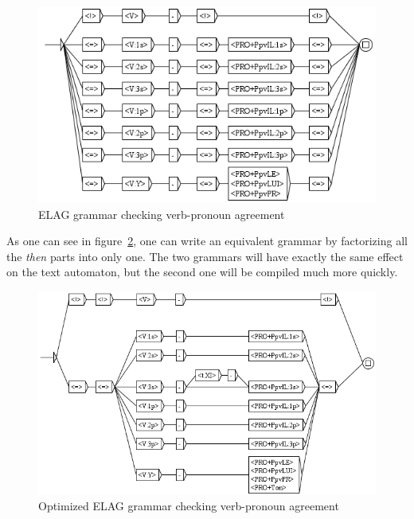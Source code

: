 \begin{figure}[!h]
\begin{center}
\includegraphics[width=15cm]{resources/img/fig7-21.png}
\caption{ELAG grammar checking verb-pronoun agreement\label{fig-NA-bad}}
\end{center}
\end{figure}

\bigskip
\noindent As one can see in figure~\ref{fig-NA-good}, one can write an
equivalent grammar by factorizing all the \textit{then} parts into only one. The two grammars will have
exactly the same effect on the text automaton, but the second one will be
compiled much more quickly.

\begin{figure}[!h]
\begin{center}
\includegraphics[width=15cm]{resources/img/fig7-22.png}
\caption{Optimized ELAG grammar checking verb-pronoun
agreement\label{fig-NA-good}}
\end{center}
\end{figure}



